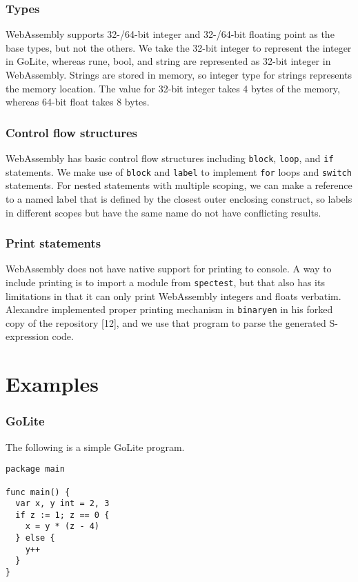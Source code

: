 \documentclass{article}
\begin{document}
\subsubsection{Types}
WebAssembly supports 32-/64-bit integer and 32-/64-bit floating point as the base types, but not the others. We take the 32-bit integer to represent the integer in GoLite, whereas rune, bool, and string are represented as 32-bit integer in WebAssembly. Strings are stored in memory, so integer type for strings represents the memory location. The value for 32-bit integer takes 4 bytes of the memory, whereas 64-bit float takes 8 bytes.

\subsubsection{Control flow structures}
WebAssembly has basic control flow structures including \verb|block|, \verb|loop|, and \verb|if| statements. We make use of \verb|block| and \verb|label| to implement \verb|for| loops and \verb|switch| statements. For nested statements with multiple scoping, we can make a reference to a named label that is defined by the closest outer enclosing construct, so labels in different scopes but have the same name do not have conflicting results.

\subsubsection{Print statements}
WebAssembly does not have native support for printing to console. A way to include printing is to import a module from \verb|spectest|, but that also has its limitations in that it can only print WebAssembly integers and floats verbatim. Alexandre implemented proper printing mechanism in \verb|binaryen| in his forked copy of the repository [12], and we use that program to parse the generated S-expression code.

\section{Examples}
\subsubsection*{GoLite}
The following is a simple GoLite program.

\begin{lstlisting}
package main

func main() {
  var x, y int = 2, 3
  if z := 1; z == 0 {
    x = y * (z - 4)
  } else {
    y++
  }
}	
\end{lstlisting}
\end{document}
